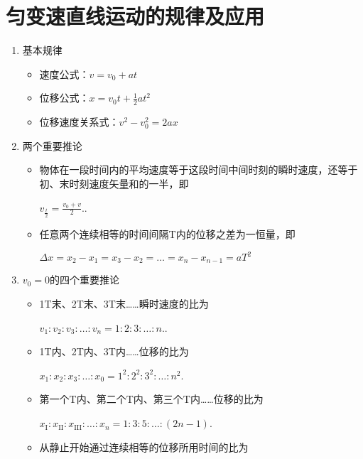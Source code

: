 \documentclass[cn,11pt]{elegantbook}
\begin{document}
   

\chapter{匀变速直线运动的规律及应用}
\begin{enumerate}
   \item 基本规律
   \begin{itemize}
      \item 速度公式：$v=v_{0}+a t$
      \item 位移公式：$x=v_{0} t+\frac{1}{2} a t^2$
      \item 位移速度关系式：$v^{2}-v_{0}^{2}=2 a x$
   \end{itemize}
   \item 两个重要推论
   \begin{itemize}
      \item 物体在一段时间内的平均速度等于这段时间中间时刻的瞬时速度，还等于初、末时刻速度矢量和的一半，即
      
      $v_{\frac{t}{2}}=\frac{v_{0}+v}{2}$..
      \item 任意两个连续相等的时间间隔T内的位移之差为一恒量，即
      
      $\Delta x=x_{2}-x_{1}=x_{3}-x_{2}=\ldots=x_{n}-x_{n-1}=a T^{2}$
   \end{itemize}
   \item $v_{0}=0$的四个重要推论
   \begin{itemize}
      \item 1T末、2T末、3T末……瞬时速度的比为
      
      $v_{1} : v_{2} : v_{3} : \ldots : v_{n}=1 : 2 : 3 : \ldots : n$..
      \item 1T内、2T内、3T内……位移的比为
      
      $x_{1} : x_{2} : x_{3} : \ldots : x_{0}=1^{2} : 2^{2} : 3^{2} : \ldots : n^{2}$.
      \item 第一个T内、第二个T内、第三个T内……位移的比为
      
      $x_{\mathrm{I}} : x_{\mathrm{II}} : x_{\mathrm{III}} : \ldots : x_{n}=1 : 3 : 5 : \ldots :(2 n-1)$.
      \item 从静止开始通过连续相等的位移所用时间的比为
      

\end{itemize}
\end{enumerate}
\end{document}
